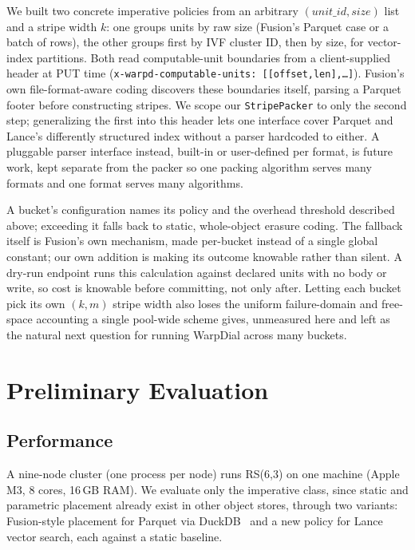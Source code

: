 \documentclass[10pt,conference]{IEEEtran}
\begin{document}
We built two concrete imperative policies from an arbitrary
$(\mathit{unit\_id},\mathit{size})$ list and a stripe width $k$: one
groups units by raw size (Fusion's Parquet case or a batch of rows),
the other groups first by IVF cluster ID, then by size, for
vector-index partitions. Both read computable-unit boundaries from a
client-supplied header at PUT time
(\texttt{x-warpd-computable-units: [[offset,len],\ldots]}). Fusion's
own file-format-aware coding discovers these boundaries itself, parsing
a Parquet footer before constructing stripes. We scope our
\texttt{StripePacker} to only the second step; generalizing the first
into this header lets one interface cover Parquet and Lance's
differently structured index without a parser hardcoded to either. A
pluggable parser interface instead, built-in or user-defined per
format, is future work, kept separate from the packer so one packing
algorithm serves many formats and one format serves many algorithms.

A bucket's configuration names its policy and the overhead threshold
described above; exceeding it falls back to static, whole-object
erasure coding. The fallback itself is Fusion's own mechanism, made
per-bucket instead of a single global constant; our own addition is
making its outcome knowable rather than silent. A dry-run endpoint
runs this calculation against
declared units with no body or write, so cost is knowable before
committing, not only after. Letting each bucket pick its own $(k,m)$
stripe width
also loses the uniform failure-domain and free-space accounting a
single pool-wide scheme gives, unmeasured here and left as the natural
next question for running WarpDial across many buckets.

\section{Preliminary Evaluation}

\subsection{Performance}
\label{sec:performance}

A nine-node cluster (one process per node) runs RS(6,3) on one
machine (Apple M3, 8 cores, 16\,GB RAM). We evaluate only the
imperative class, since static and parametric placement
already exist in other object stores, through two variants:
Fusion-style placement for Parquet via DuckDB~\cite{duckdb2019,tpch}
and a new policy for Lance~\cite{lance2025} vector search, each against
a static baseline.
\end{document}
